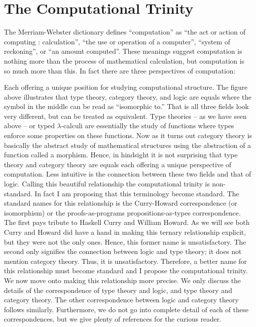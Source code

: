 \chapter{The Computational Trinity}
\label{chap:the_three_perspectives}
The Merriam-Webster dictionary defines ``computation'' as ``the act or
action of computing : calculation'', ``the use or operation of a
computer'', ``system of reckoning'', or ``an amount computed''.  These
meanings suggest computation is nothing more than the process of
mathematical calculation, but computation is so much more than this.
In fact there are three perspectives of computation:
\begin{center}
\end{center}
Each offering a unique position for studying computational structure.
The figure above illustrates that type theory, category theory, and
logic are equals where the symbol in the middle can be read as
``isomorphic to.''  That is all three fields look very different, but
can be treated as equivalent.  Type theories -- as we have seen above
-- or typed $\lambda$-calculi are essentially the study of functions
where types enforce some properties on these functions.  Now as it
turns out category theory is basically the abstract study of
mathematical structures using the abstraction of a function called a
morphism.  Hence, in hindsight it is not surprising that type theory
and category theory are equals each offering a unique perspective of
computation.  Less intuitive is the connection between these two
fields and that of logic.  Calling this beautiful relationship the
computational trinity is non-standard.  In fact I am
proposing that this terminology become standard.  The standard names
for this relationship is the Curry-Howard correspondence (or
isomorphism) or the proofs-as-programs propositions-as-types
correspondence.  The first pays tribute to Haskell Curry and William
Howard. As we will see both Curry and Howard did have a hand in making
this ternary relationship explicit, but they were not the only ones.
Hence, this former name is unsatisfactory. The second only signifies
the connection between logic and type theory; it does not mention
category theory.  Thus, it is unsatisfactory.  Therefore, a better
name for this relationship must become standard and I propose the
computational trinity.  We now move onto making this
relationship more precise.  We only discuss the details of the
correspondence of type theory and logic, and type theory and category
theory.  The other correspondence between logic and category theory
follows similarly. Furthermore, we do not go into complete detail of
each of these correspondences, but we give plenty of references for
the curious reader.

